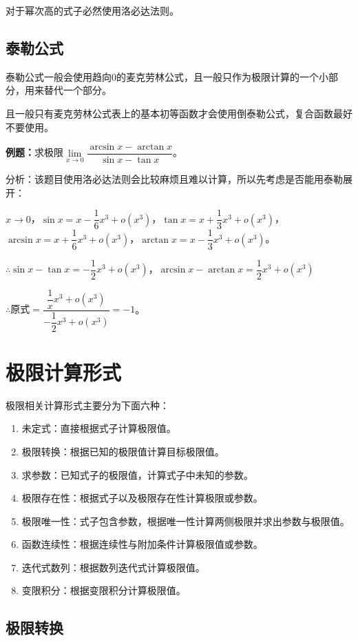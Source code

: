 \documentclass[UTF8, 12pt]{ctexart}
\begin{document}
对于幂次高的式子必然使用洛必达法则。

\subsection{泰勒公式}

泰勒公式一般会使用趋向0的麦克劳林公式，且一般只作为极限计算的一个小部分，用来替代一个部分。

且一般只有麦克劳林公式表上的基本初等函数才会使用倒泰勒公式，复合函数最好不要使用。

\textbf{例题：}求极限$\lim\limits_{x\to 0}\dfrac{\arcsin x-\arctan x}{\sin x-\tan x}$。\medskip

分析：该题目使用洛必达法则会比较麻烦且难以计算，所以先考虑是否能用泰勒展开：

$x\to 0$，$\sin x=x-\dfrac{1}{6}x^3+o(x^3)$，$\tan x=x+\dfrac{1}{3}x^3+o(x^3)$，$\arcsin x=x+\dfrac{1}{6}x^3+o(x^3)$，$\arctan x=x-\dfrac{1}{3}x^3+o(x^3)$。

$\therefore \sin x-\tan x=-\dfrac{1}{2}x^3+o(x^3)$，$\arcsin x-\arctan x=\dfrac{1}{2}x^3+o(x^3)$

$\therefore \text{原式}=\dfrac{\dfrac{1}{x}x^3+o(x^3)}{-\dfrac{1}{2}x^3+o(x^3)}=-1$。

\section{极限计算形式}

极限相关计算形式主要分为下面六种：

\begin{enumerate}
    \item 未定式：直接根据式子计算极限值。
    \item 极限转换：根据已知的极限值计算目标极限值。
    \item 求参数：已知式子的极限值，计算式子中未知的参数。
    \item 极限存在性：根据式子以及极限存在性计算极限或参数。
    \item 极限唯一性：式子包含参数，根据唯一性计算两侧极限并求出参数与极限值。
    \item 函数连续性：根据连续性与附加条件计算极限值或参数。
    \item 迭代式数列：根据数列迭代式计算极限值。
    \item 变限积分：根据变限积分计算极限值。
\end{enumerate}

\subsection{极限转换}
\end{document}
